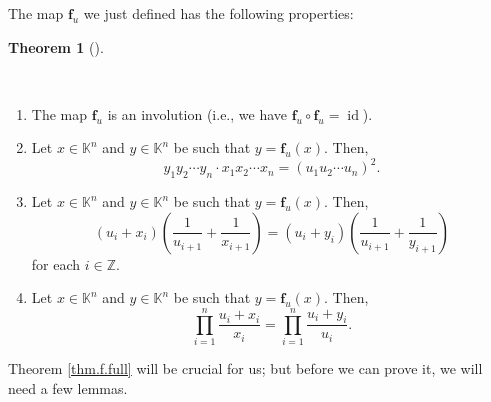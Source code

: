 \documentclass[numbers=enddot,12pt,final,onecolumn,notitlepage]{scrartcl}%
\theoremstyle{definition}
\newtheorem{theo}{Theorem}[section]
\newenvironment{theorem}[1][]
{\begin{theo}[#1]\begin{leftbar}}
{\end{leftbar}\end{theo}}
\let\prodnonlimits\prod
\renewcommand{\prod}{\prodnonlimits\limits}
\begin{document}
The map $\mathbf{f}_{u}$ we just defined has the following properties:

\begin{theorem}
\label{thm.f.full}\ \ 

\begin{enumerate}
\item[\textbf{(a)}] The map $\mathbf{f}_{u}$ is an involution (i.e., we have
$\mathbf{f}_{u}\circ\mathbf{f}_{u}=\operatorname*{id}$).

\item[\textbf{(b)}] Let $x\in\mathbb{K}^{n}$ and $y\in\mathbb{K}^{n}$ be such
that $y=\mathbf{f}_{u}\left(  x\right)  $. Then,%
\[
y_{1}y_{2}\cdots y_{n}\cdot x_{1}x_{2}\cdots x_{n}=\left(  u_{1}u_{2}\cdots
u_{n}\right)  ^{2}.
\]


\item[\textbf{(c)}] Let $x\in\mathbb{K}^{n}$ and $y\in\mathbb{K}^{n}$ be such
that $y=\mathbf{f}_{u}\left(  x\right)  $. Then,%
\[
\left(  u_{i}+x_{i}\right)  \left(  \dfrac{1}{u_{i+1}}+\dfrac{1}{x_{i+1}%
}\right)  =\left(  u_{i}+y_{i}\right)  \left(  \dfrac{1}{u_{i+1}}+\dfrac
{1}{y_{i+1}}\right)
\]
for each $i\in\mathbb{Z}$.

\item[\textbf{(d)}] Let $x\in\mathbb{K}^{n}$ and $y\in\mathbb{K}^{n}$ be such
that $y=\mathbf{f}_{u}\left(  x\right)  $. Then,%
\[
\prod_{i=1}^{n}\dfrac{u_{i}+x_{i}}{x_{i}}=\prod_{i=1}^{n}\dfrac{u_{i}+y_{i}%
}{u_{i}}.
\]

\end{enumerate}
\end{theorem}

Theorem \ref{thm.f.full} will be crucial for us; but before we can prove it,
we will need a few lemmas.
\end{document}
